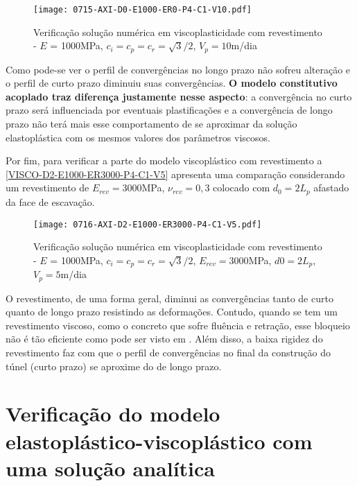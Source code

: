 \begin{figure}[H]
	\begin{center}
		\texttt{[image: 0715-AXI-D0-E1000-ER0-P4-C1-V10.pdf]}
	\end{center}
	\caption{\label{VISCO-D0-E1000-ER0-P4-C1-V10}Verificação solução numérica em viscoplasticidade com revestimento - $E$ = 1000MPa, $c_i=c_p=c_r=\sqrt{3}/2$, $V_p=10$m/dia}
\end{figure}
Como pode-se ver o perfil de convergências no longo prazo não sofreu alteração e o perfil de curto prazo diminuiu suas convergências. \textbf{O modelo constitutivo acoplado traz diferença justamente nesse aspecto}: a convergência no curto prazo será influenciada por eventuais plastificações e a convergência de longo prazo não terá mais esse comportamento de se aproximar da solução elastoplástica com os mesmos valores dos parâmetros viscosos.

Por fim, para verificar a parte do modelo viscoplástico com revestimento a \autoref{VISCO-D2-E1000-ER3000-P4-C1-V5} apresenta uma comparação considerando um revestimento de $E_{rev}=3000$MPa, $\nu_{rev}=0,3$ colocado com $d_0=2L_p$ afastado da face de escavação.

\begin{figure}[H]
	\begin{center}
		\texttt{[image: 0716-AXI-D2-E1000-ER3000-P4-C1-V5.pdf]}
	\end{center}
	\caption{\label{VISCO-D2-E1000-ER3000-P4-C1-V5}Verificação solução numérica em viscoplasticidade com revestimento - $E$ = 1000MPa, $c_i=c_p=c_r=\sqrt{3}/2$, $E_{rev} = 3000$MPa, $d0=2L_p$, $V_p=5$m/dia}
\end{figure}
O revestimento, de uma forma geral, diminui as convergências tanto de curto quanto de longo prazo resistindo as deformações. Contudo, quando se tem um revestimento viscoso, como o concreto que sofre fluência e retração, esse bloqueio não é tão eficiente como pode ser visto em . Além disso, a baixa rigidez do revestimento faz com que o perfil de convergências no final da construção do túnel (curto prazo) se aproxime do de longo prazo.

\section{Verificação do modelo elastoplástico-viscoplástico com uma solução analítica}

